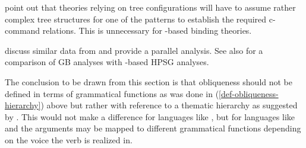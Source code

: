 \documentclass[output=paper
	        ,collection
	        ,collectionchapter
 	        ,biblatex
                ,babelshorthands
                ,newtxmath
                ,draftmode
                ,colorlinks, citecolor=brown
]{langscibook}
\begin{document}
\citet[]{MS98a} point out that theories relying on tree configurations will have to assume
rather complex tree structures for one of the patterns to establish the required c-command
relations. This is unnecessary for \argst-based binding theories.

\citet{WA98a-u} discuss similar data from  and provide a parallel analysis. See also
\citet{Wechsler99a-u} for a comparison of GB analyses with \argst-based HPSG analyses.

The conclusion to be drawn from this section is that obliqueness should not be defined in terms of
grammatical functions as was done in (\ref{def-obliqueness-hierarchy}) above but rather with reference to a thematic hierarchy
as suggested by \citet{Jackendoff72a-u}.
This would not make a difference for languages like , but for languages like
 and  the arguments may be mapped to different grammatical functions
depending on the voice the verb is realized in.
\end{document}

